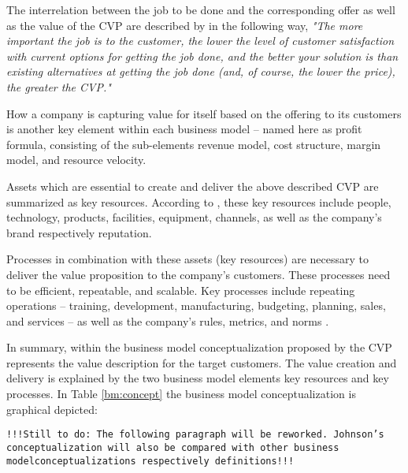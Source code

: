 The interrelation between the job to be done and the corresponding offer as well as the value of the \ac{CVP} are described by  \citet[p. 52]{Johnson2008} in the following way, \textit{"The more important the job is to the customer, the lower the level of customer satisfaction with current options for getting the job done, and the better your solution is than existing alternatives at getting the job done (and, of course, the lower the price), the greater the CVP."}

How a company is capturing value for itself based on the offering to its customers is another key element within each business model -- named here as profit formula, consisting of the sub-elements revenue model, cost structure, margin model, and resource velocity.

Assets which are essential to create and deliver the above described \ac{CVP} are summarized as key resources. According to \citet[p. 53]{Johnson2008}, these key resources include people, technology, products, facilities, equipment, channels, as well as the company's brand respectively reputation.

Processes in combination with these assets (key resources) are necessary to deliver the value proposition to the company's customers. These processes need to be efficient, repeatable, and scalable. Key processes include repeating operations -- training, development, manufacturing, budgeting, planning, sales, and services -- as well as the company's rules, metrics, and norms \citep[p. 53]{Johnson2008}.

In summary, within the business model conceptualization proposed by \citet[p. 54]{Johnson2008} the \ac{CVP} represents the value description for the target customers. The value creation and delivery is explained by the two business model elements key resources and key processes. In Table \ref{bm:concept} the business model conceptualization is graphical depicted:



\texttt{!!!Still to do: The following paragraph will be reworked. Johnson's conceptualization will also be compared with other business model\linebreak conceptualizations respectively definitions!!!}

